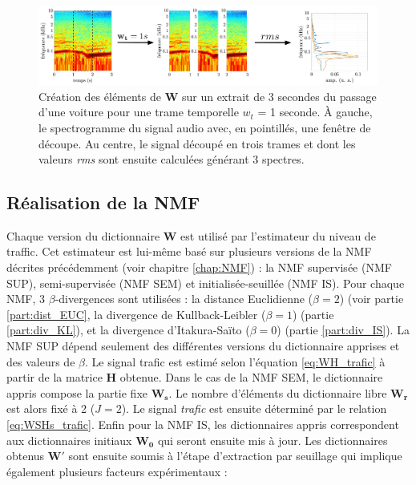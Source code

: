 \begin{figure}[hbtp]
\centering
\includegraphics[width=\linewidth]{./figures/NMF/dictionaire_frame_FR.pdf}
\caption{Création des éléments de $\mathbf{W}$ sur un extrait de 3 secondes du passage d'une voiture pour une trame temporelle $w_t$ = 1 seconde. À gauche, le spectrogramme du signal audio avec, en pointillés, une fenêtre de découpe. Au centre, le signal découpé en trois trames et dont les valeurs \textit{rms} sont ensuite calculées générant 3 spectres.}
\label{fig:decoupe_W}
\end{figure}

\subsection{Réalisation de la NMF}

Chaque version du dictionnaire $\mathbf{W}$ est utilisé par l'estimateur du niveau de traffic. Cet estimateur est lui-même basé sur plusieurs versions de la NMF décrites précédemment (voir chapitre \ref{chap:NMF})  : la NMF supervisée (NMF SUP), semi-supervisée (NMF SEM) et initialisée-seuillée (NMF IS). Pour chaque NMF, 3 $\beta$-divergences sont utilisées : la distance Euclidienne ($\beta = 2$) (voir partie \ref{part:dist_EUC}, la divergence de Kullback-Leibler ($\beta = 1$) (partie \ref{part:div_KL}), et la divergence d'Itakura-Saïto ($\beta = 0$) (partie \ref{part:div_IS}). La NMF SUP dépend seulement des différentes versions du dictionnaire apprises et des valeurs de $\beta$. Le signal trafic est estimé selon l'équation \ref{eq:WH_trafic} à partir de la matrice $\mathbf{H}$ obtenue.
Dans le cas de la NMF SEM, le dictionnaire appris compose la partie fixe $\mathbf{W_s}$. Le nombre d'éléments du dictionnaire libre $\mathbf{W_r}$ est alors fixé à 2 ($J = 2$). Le signal \textit{trafic} est ensuite déterminé par le relation \ref{eq:WSHs_trafic}.
Enfin pour la NMF IS, les dictionnaires appris correspondent aux dictionnaires initiaux $\mathbf{W_0}$ qui seront ensuite mis à jour. Les dictionnaires obtenus $\mathbf{W'}$ sont ensuite soumis à l'étape d'extraction par seuillage qui implique également plusieurs facteurs expérimentaux :

